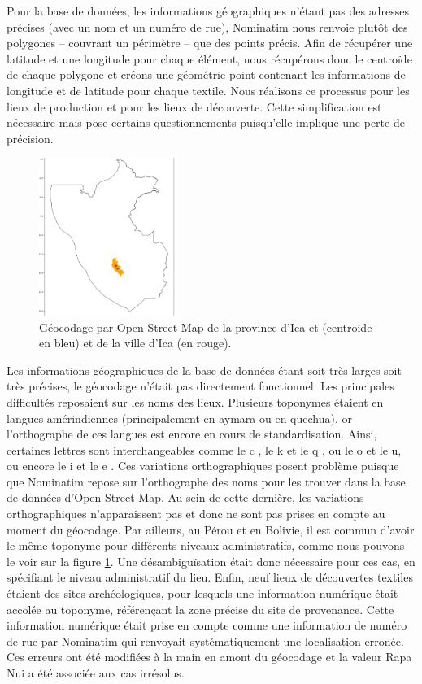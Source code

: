 Pour la base de données, les informations géographiques n'étant pas des adresses précises (avec un nom et un numéro de rue), Nominatim nous renvoie plutôt des polygones -- couvrant un périmètre -- que des points précis. Afin de récupérer une latitude et une longitude pour chaque élément, nous récupérons donc le centroïde de chaque polygone et créons une géométrie \og point \fg \:contenant les informations de longitude et de latitude pour chaque textile. Nous réalisons ce processus pour les lieux de production et pour les lieux de découverte. Cette simplification est nécessaire mais pose certains questionnements puisqu'elle implique une perte de précision.

\begin{figure}
    \centering
    \includegraphics[width=0.4\textwidth]{../images/Ica.png}
    \caption{Géocodage par Open Street Map de la province d'Ica et (centroïde en bleu) et de la ville d'Ica (en rouge).}
    \label{fig:Ica}
\end{figure}

Les informations géographiques de la base de données étant soit très larges soit très précises, le géocodage n'était pas directement fonctionnel. Les principales difficultés reposaient sur les noms des lieux. Plusieurs toponymes étaient en langues amérindiennes (principalement en aymara ou en quechua), or l'orthographe de ces langues est encore en cours de standardisation. Ainsi, certaines lettres sont interchangeables comme le \og c \fg, le \og k \fg \:et le \og q \fg, ou le \og o \fg \:et le \og u\fg, ou encore le \og i \fg \:et le \og e \fg. Ces variations orthographiques posent problème puisque que Nominatim repose sur l'orthographe des noms pour les trouver dans la base de données d'Open Street Map. Au sein de cette dernière, les variations orthographiques n'apparaissent pas et donc ne sont pas prises en compte au moment du géocodage. Par ailleurs, au Pérou et en Bolivie, il est commun d'avoir le même toponyme pour différents niveaux administratifs, comme nous pouvons le voir sur la figure \ref{fig:Ica}. Une désambiguïsation était donc nécessaire pour ces cas, en spécifiant le niveau administratif du lieu. Enfin, neuf lieux de découvertes textiles étaient des sites archéologiques, pour lesquels une information numérique était accolée au toponyme, référençant la zone précise du site de provenance. Cette information numérique était prise en compte comme une information de numéro de rue par Nominatim qui renvoyait systématiquement une localisation erronée. Ces erreurs ont été modifiées à la main en amont du géocodage et la valeur \og Rapa Nui \fg \:a été associée aux cas irrésolus.


